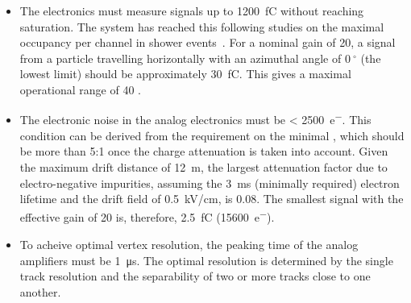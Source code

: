 \begin{itemize}
\item{The  electronics must measure signals up to \SI{1200}{\femto\coulomb} without reaching saturation. The system has reached this following  studies on the maximal occupancy per channel in shower events~\cite{WA105-TDR}. For a nominal  gain of \num{20}, a  signal from a particle travelling horizontally with an azimuthal angle of $\SI{0}{^\circ}$ (the lowest limit) should be approximately \SI{30}{fC}. This gives  a maximal operational range of \num{40} .}

\item{The electronic noise in the  analog electronics must be \SI{< 2500}{e^{-}}. This condition can be derived from the requirement on the minimal , which should be more than \num{5}:\num{1} once the charge attenuation is taken into account. Given the maximum drift distance of \SI{12}{\meter}, the largest attenuation factor due to electro-negative impurities, assuming the \SI{3}{\milli\second} (minimally required) electron lifetime and the drift field of \SI{0.5}{\kilo\volt/\cm}, is \num{0.08}. The smallest  signal with the  effective gain of \num{20} is, therefore, \SI{2.5}{\femto\coulomb} (\SI{15600}{e^{-}}).}


\item{To acheive optimal vertex resolution, the peaking time of the  analog amplifiers must be \SI{1}{\micro\second}. The optimal resolution is determined by the single track resolution and the separability of two or more tracks close to one another.}


\end{itemize}
